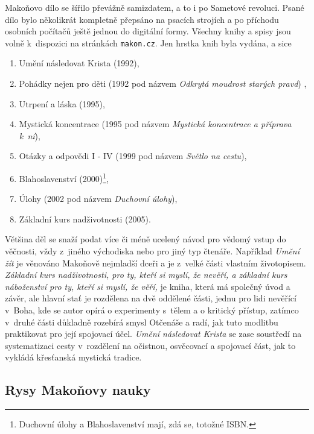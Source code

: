 Makoňovo dílo se šířilo převážně samizdatem, a to i po
Sametové revoluci. Psané dílo bylo několikrát kompletně přepsáno na
psacích strojích a po příchodu osobních počítačů ještě jednou do digitální formy. Všechny knihy a
spisy jsou volně k~dispozici na stránkách \texttt{makon.cz}. Jen hrstka knih
byla vydána, a sice
\begin{enumerate}
\item{Umění následovat Krista (1992)\cite{makon1995umeni},}
\item{
    Pohádky nejen pro děti (1992 pod názvem {\em Odkrytá moudrost starých
    pravd}) \cite{makon1992odkryta},
}
\item{Utrpení a láska (1995)\cite{makon1995utrpeni},}
\item{
    Mystická koncentrace (1995 pod názvem
    {\em Mystická koncentrace a příprava k~ní})\cite{makon1995mysticka},
}
\item{
    Otázky a odpovědi I - IV (1999 pod názvem {\em Světlo na cestu})\cite{makon1999svetlo},
}
\item{
    Blahoslavenství
    (2000)\cite{makon2000blahoslavenstvi}\footnote{\label{note1}
        Duchovní úlohy a Blahoslavenství mají, zdá se, totožné ISBN.
    },
}
\item{
    Úlohy (2002 pod názvem {\em Duchovní
    úlohy})\cite{makon2002ulohy},
}
\item{Základní kurs nadživotnosti (2005)\cite{makon2005zakladni}.}
\end{enumerate}

Většina děl se snaží podat více či méně ucelený návod pro vědomý vstup do
věčnosti, vždy z~jiného východiska nebo pro jiný typ čtenáře. Například {\em Umění
žít} je věnováno Makoňově nejmladší dceři a je z~velké části vlastním
životopisem. {\em Základní kurs nadživotnosti, pro ty, kteří si myslí, že nevěří, a
základní kurs náboženství pro ty, kteří si myslí, že věří,} je kniha, která má
společný úvod a závěr, ale hlavní stať je rozdělena na dvě oddělené části, jednu
pro lidi nevěřící v~Boha, kde se autor opírá o experimenty s~tělem a o kritický
přístup, zatímco v~druhé části důkladně rozebírá smysl Otčenáše a radí,
jak tuto modlitbu praktikovat pro její spojovací účel. {\em Umění následovat
Krista} se zase soustředí na systematizaci cesty v~rozdělení na očistnou,
osvěcovací a spojovací část, jak to vykládá křesťanská mystická tradice.

\subsection{Rysy Makoňovy nauky}

